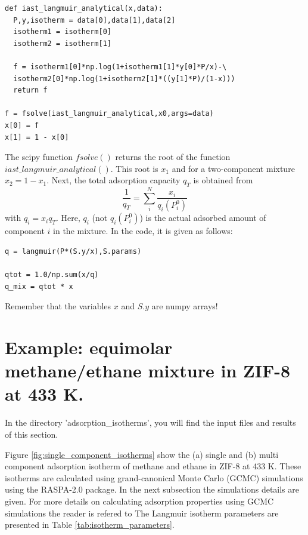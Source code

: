 \documentclass{article}
\begin{document}
\begin{lstlisting}[caption={Find root of equation (\ref{eq:find_root}) and obtain $x_1$.}]
def iast_langmuir_analytical(x,data):
  P,y,isotherm = data[0],data[1],data[2]
  isotherm1 = isotherm[0]
  isotherm2 = isotherm[1]

  f = isotherm1[0]*np.log(1+isotherm1[1]*y[0]*P/x)-\
  isotherm2[0]*np.log(1+isotherm2[1]*((y[1]*P)/(1-x)))
  return f

f = fsolve(iast_langmuir_analytical,x0,args=data)
x[0] = f
x[1] = 1 - x[0]
\end{lstlisting}

The scipy function $fsolve()$ returns the root of the function $iast\_langmuir\_analytical()$. This root is $x_1$ and for a two-component mixture $x_2 = 1 - x_1$. Next, the total adsorption capacity $q_T$ is obtained from
%
\begin{equation}
        \frac{1}{q_T} = \sum_{i}^N\frac{x_i}{q_i(P_i^0)}
	\label{eq:total_adsorbed_loading}
\end{equation}
%
with $q_i={x_i}q_T$. Here, $q_i$ (not $q_i(P_i^0)$) is the actual adsorbed amount of component $i$ in the mixture. In the code, it is given as follows: 
%
\begin{lstlisting}[caption={Compute the mixture adsorption isotherms based on equation (\ref{eq:total_adsorbed_loading}).}]
q = langmuir(P*(S.y/x),S.params)

qtot = 1.0/np.sum(x/q)
q_mix = qtot * x
\end{lstlisting}
%
Remember that the variables $x$ and $S.y$ are numpy arrays!

\section{Example: equimolar methane/ethane mixture in ZIF-8 at 433 K.}
In the directory 'adsorption\_isotherms', you will find the input files and results of this section.

Figure \ref{fig:single_component_isotherms} show the (a) single and (b) multi component adsorption isotherm of methane and ethane in ZIF-8 at 433 K. These isotherms are calculated using grand-canonical Monte Carlo (GCMC) simulations using the RASPA-2.0 package.\cite{Dubbeldam2013} In the next subsection the simulations details are given. For more details on calculating adsorption properties using GCMC simulations the reader is refered to \cite{Frenkel2001,Dubbeldam2013,Dubbeldam2015} The Langmuir isotherm parameters are presented in Table \ref{tab:isotherm_parameters}.
\end{document}
